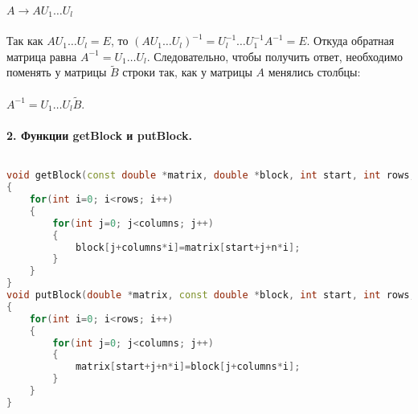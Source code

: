 \documentclass[14pt,a4paper, openany]{article}
\begin{document}
$A \longrightarrow AU_1\ldots U_l$\\ \\
Так как $AU_1\ldots U_l = E$, то
$(AU_1\ldots U_l)^{-1} = U_l^{-1}\ldots U_1^{-1}A^{-1} = E$.
Откуда обратная матрица равна $A^{-1} = U_1\ldots U_l$. 
Следовательно, чтобы получить ответ, необходимо поменять у матрицы $\tilde B$ строки так, как у матрицы $A$ менялись столбцы: \\ \\
$A^{-1} = U_1\ldots U_l\tilde B$. \\
\newpage
\paragraph{2. Функции getBlock и putBlock.}$ $

\begin{lstlisting}[language = C++]
void getBlock(const double *matrix, double *block, int start, int rows, int columns, int n)
{
	for(int i=0; i<rows; i++)
	{
		for(int j=0; j<columns; j++)
		{
			block[j+columns*i]=matrix[start+j+n*i];
		}
	}
}
void putBlock(double *matrix, const double *block, int start, int rows, int columns, int n)
{
	for(int i=0; i<rows; i++)
	{
		for(int j=0; j<columns; j++)
		{
			matrix[start+j+n*i]=block[j+columns*i];
		}
	}
}

\end{lstlisting}
\end{document}
